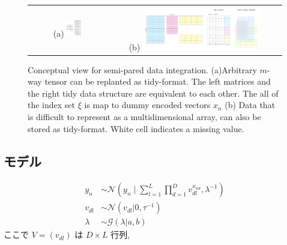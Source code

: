\documentclass[a4paper,12ptc]{jsarticle} %
\newcommand{\normal}{\mathcal{N}}
\newcommand{\gam}{\mathcal{G}}
\begin{document}
\begin{figure}
    \centering
    \begin{tabular}{c|c}
    \footnotesize (a)
    \includegraphics[width=0.2\textwidth]{img/threeway.pdf} &
    \footnotesize (b)
    \includegraphics[width=0.7\textwidth]{img/mosaic.pdf} 
    \end{tabular}
    \caption{Conceptual view for semi-pared data integration. (a)Arbitrary $m$-way tensor can be replanted as tidy-format. The left matrices and the right tidy data structure are equivalent to each other. The all of the index set $\xi$ is map to dummy encoded vectors $x_n$ (b) Data that is difficult to represent as a multidimensional array, can also be stored as tidy-format. White cell indicates a missing value.}
    \label{fig_mosaic}
\end{figure}

\subsection{モデル}

\begin{align}
y_n & \sim \normal\left(y_n \mid \sum_{l=1}^L \prod_{d=1}^D v_{dl}^{x_{nd}}, \lambda^{-1}\right) \label{eq_mod1}\\
v_{dl} & \sim \normal(v_{dl} | 0,\tau^{-1}) \label{eq_prior1}\\
\lambda & \sim \gam(\lambda | a,b) \nonumber
\end{align}
ここで $V=(v_{dl})$ は $D \times L$  行列, 
\end{document}
